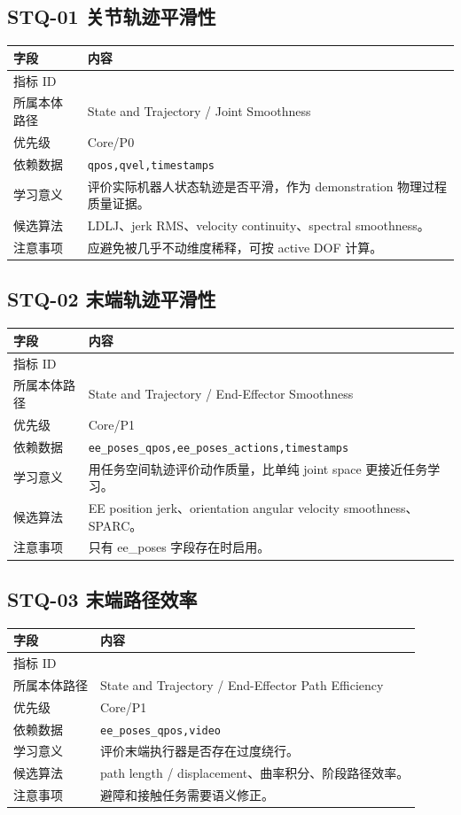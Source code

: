 \documentclass[UTF8,zihao=-4,oneside,openany]{ctexrep}
\newcommand{\Code}[1]{\texttt{#1}}
\newcommand{\MID}[1]{\texttt{\seqsplit{#1}}}
\begin{document}
\subsection{STQ-01 关节轨迹平滑性}

\begin{longtable}{L{3.6cm} L{9.6cm}}
\toprule
字段 & 内容 \\
\midrule
指标 ID & \MID{STQ-01} \\
所属本体路径 & State and Trajectory / Joint Smoothness \\
优先级 & Core/P0 \\
依赖数据 & \Code{qpos,qvel,timestamps} \\
学习意义 & 评价实际机器人状态轨迹是否平滑，作为 demonstration 物理过程质量证据。 \\
候选算法 & LDLJ、jerk RMS、velocity continuity、spectral smoothness。 \\
注意事项 & 应避免被几乎不动维度稀释，可按 active DOF 计算。 \\
\bottomrule
\end{longtable}

\subsection{STQ-02 末端轨迹平滑性}

\begin{longtable}{L{3.6cm} L{9.6cm}}
\toprule
字段 & 内容 \\
\midrule
指标 ID & \MID{STQ-02} \\
所属本体路径 & State and Trajectory / End-Effector Smoothness \\
优先级 & Core/P1 \\
依赖数据 & \Code{ee\_poses\_qpos,ee\_poses\_actions,timestamps} \\
学习意义 & 用任务空间轨迹评价动作质量，比单纯 joint space 更接近任务学习。 \\
候选算法 & EE position jerk、orientation angular velocity smoothness、SPARC。 \\
注意事项 & 只有 ee\_poses 字段存在时启用。 \\
\bottomrule
\end{longtable}

\subsection{STQ-03 末端路径效率}

\begin{longtable}{L{3.6cm} L{9.6cm}}
\toprule
字段 & 内容 \\
\midrule
指标 ID & \MID{STQ-03} \\
所属本体路径 & State and Trajectory / End-Effector Path Efficiency \\
优先级 & Core/P1 \\
依赖数据 & \Code{ee\_poses\_qpos,video} \\
学习意义 & 评价末端执行器是否存在过度绕行。 \\
候选算法 & path length / displacement、曲率积分、阶段路径效率。 \\
注意事项 & 避障和接触任务需要语义修正。 \\
\bottomrule
\end{longtable}
\end{document}
